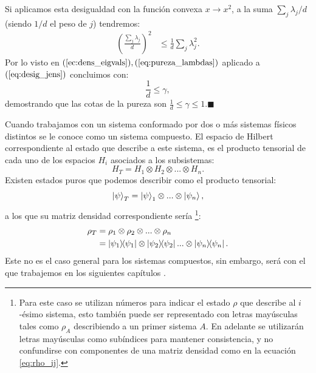 \documentclass[letterpaper,12pt]{thesisECFM}
\theoremstyle{plain}
\theoremstyle{definition}
\theoremstyle{definition}
\theoremstyle{remark}
\newcommand{\1}{\mathbb{1}}
\begin{document}
Si aplicamos esta desigualdad con la función convexa $x \xrightarrow{}x^2$,  a
la suma $\sum_j \lambda_j /d$ (siendo $1/d$ el peso de $j$) tendremos:
    \begin{align}
    \label{eq:desig_jens}
        \left( \frac{\sum_j  \lambda_j}{d}\right)^2  & \leq \frac{1}{d} \sum_j \lambda_j^2.
    \end{align}
Por lo visto en $(\ref{ec:dens_eigvals}),(\ref{eq:pureza_lambdas})$ aplicado a $(\ref{eq:desig_jens})$ concluimos con:
\begin{equation}
    \frac{1}{d} \leq \gamma, 
\end{equation}
demostrando que las cotas de la pureza son $\frac{1}{d} \leq \gamma \leq
1$.$\blacksquare$ 

Cuando trabajamos con un sistema conformado por dos o más sistemas físicos
distintos se le conoce como un sistema compuesto.  El espacio de Hilbert
correspondiente al estado que describe a este sistema, es el producto
tensorial de cada uno de los espacios $H_i$ asociados a los subsistemas: 
\begin{equation}
H_T=H_1 \otimes H_2\otimes ...\otimes H_n.
\end{equation}
 Existen estados puros que podemos describir como el producto tensorial: 
\begin{equation}
    \ket{\psi}_T = \ket{\psi}_1 \otimes ... \otimes \ket{\psi_n},
\end{equation}
a los que su matriz densidad correspondiente sería \cite{nielsen_chuang_2011}
\footnote{Para este caso se utilizan números para indicar el estado $\rho$ que
describe al $i$-ésimo sistema, esto también puede ser representado con letras
mayúsculas tales como $\rho_A$ describiendo a un primer sistema $A$. En
adelante se utilizarán letras mayúsculas como subíndices para mantener
consistencia, y no confundirse con componentes de una matriz densidad como en
la ecuación \ref{eq:rho_ij}.}: 
\begin{align}
    \rho_T  & = \rho_1 \otimes \rho_2 \otimes  ... \otimes \rho_n \\
            & = \ketbra{\psi_1} \otimes \ketbra{\psi_2} ... \otimes \ketbra{\psi_n}. 
\end{align}
Este no es el caso general para los sistemas compuestos, sin embargo, será con
el que trabajemos en los siguientes capítulos  .
\end{document}
